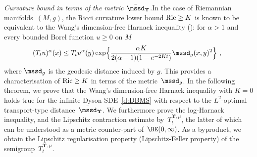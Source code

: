 \documentclass[11pt,letterpaper]{amsart}
\newcommand{\dom}[1]{\mathcal D(#1)}
\newcommand{\diff}{\mathop{}\!\mathrm{d}}
\newcommand{\comma}{\,\,\mathrm{,}\;\,}
\newcommand{\cdc}{\Gamma}
\newcommand{\purple}[1]{{\color{purple}#1}}
\newcommand{\QP}{{\mu}}
\newcommand{\dUpsilon}{{\mathbf \Upsilon}}
\newcommand{\U}{\dUpsilon}
\newcommand{\E}{\mathcal E}
\renewcommand{\1}{\mathbf 1}
\numberwithin{equation}{section}
\theoremstyle{plain}
\theoremstyle{definition}
\theoremstyle{remark}
\renewcommand{\paragraph}[1]{\medskip\emph{#1}.\quad}
\begin{document}
\paragraph{Curvature bound in terms of the metric $\bar\mssd_\U$}In the case of Riemannian manifolds~$(M,g)$, the Ricci curvature lower bound ${\rm Ric} \ge K$ is known to be equivalent to the Wang's dimension-free Harnack inequality (\cite[Thm.~2.3.3]{Wan14}): for $\alpha>1$ and every bounded Borel function $u \ge 0$ on $M$
\begin{align*}%
(T_tu)^\alpha(x)\le T_tu^\alpha(y) \exp\Bigl\{ \frac{\alpha K}{2(\alpha-1)(1-e^{-2Kt})}\mssd_g(x, y)^2\Bigr\} \comma %
\end{align*}
where $\mssd_g$ is the geodesic distance induced by $g$. This provides a characterisation of ${\rm Ric} \ge K$ in terms of the metric~$\mssd_g$. 
In the following theorem, we prove that the Wang's dimension-free Harnack inequality with $K=0$ holds true for the infinite Dyson SDE~\eqref{d:DBMS} with respect to the $L^2$-optimal transport-type distance~$\bar\mssd_\U$. We furthermore prove the log-Harnack inequality, and the Lipschitz contraction estimate by~$T_t^{\U, \QP}$, the latter of which can be understood as  a metric counter-part of~$\BE(0,\infty)$. As a byproduct, we obtain the Lipschitz regularisation property (Lipschitz-Feller property) of the semigroup~$T_t^{\U, \QP}$. 
\end{document}
